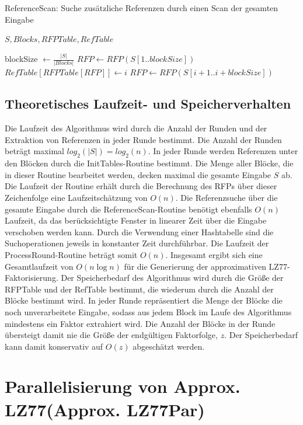 \begin{algorithm}[ht]
\centering
\caption{ReferenceScan: Suche zusätzliche Referenzen durch einen Scan der gesamten Eingabe} \label{alg:refscan}
\algorithmicrequire $S, Blocks, RFPTable, RefTable$
\begin{algorithmic} [1]
    \STATE blockSize $\gets \frac{|S|}{|Blocks|}$
    \STATE $RFP \gets RFP(S[1..blockSize])$
            \STATE $RefTable[RFPTable[RFP]] \gets i$
        \ENDIF
        \STATE $RFP \gets RFP(S[i+1..i+blockSize])$ 
    \ENDFOR
\end{algorithmic}
\end{algorithm}


\subsection{Theoretisches Laufzeit- und Speicherverhalten}
Die Laufzeit des Algorithmus wird durch die Anzahl der Runden und der Extraktion von Referenzen in jeder Runde bestimmt. Die Anzahl der Runden beträgt maximal $log_2(|S|)=log_2(n)$. In jeder Runde
werden Referenzen unter den Blöcken durch die InitTables-Routine bestimmt. Die Menge aller Blöcke, die in dieser Routine bearbeitet werden, decken maximal die gesamte Eingabe $S$ ab. Die Laufzeit
der Routine erhält durch die Berechnung des RFPs über dieser Zeichenfolge eine Laufzeitschätzung von $O(n)$. Die Referenzsuche über die gesamte Eingabe durch die ReferenceScan-Routine benötigt ebenfalls
$O(n)$ Laufzeit, da das berücksichtigte Fenster in linearer Zeit über die Eingabe verschoben werden kann. Durch die Verwendung einer Hashtabelle sind die Suchoperationen jeweils in konstanter Zeit
durchführbar. Die Laufzeit der ProcessRound-Routine beträgt somit $O(n)$. Insgesamt ergibt sich eine Gesamtlaufzeit von $O(n\log{n})$ für die Generierung der approximativen LZ77-Faktorisierung. 
Der Speicherbedarf des Algorithmus wird durch die Größe der RFPTable und der RefTable bestimmt, die wiederum durch die Anzahl der Blöcke bestimmt wird. In jeder Runde repräsentiert die Menge der Blöcke 
die noch unverarbeitete Eingabe, sodass aus jedem Block im Laufe des Algorithmus mindestens ein Faktor extrahiert wird. Die Anzahl der Blöcke in der Runde übersteigt damit nie die Größe der endgültigen
Faktorfolge, $z$. Der Speicherbedarf kann damit konservativ auf $O(z)$ abgeschätzt werden.

\section{Parallelisierung von Approx. LZ77(Approx. LZ77Par)}
